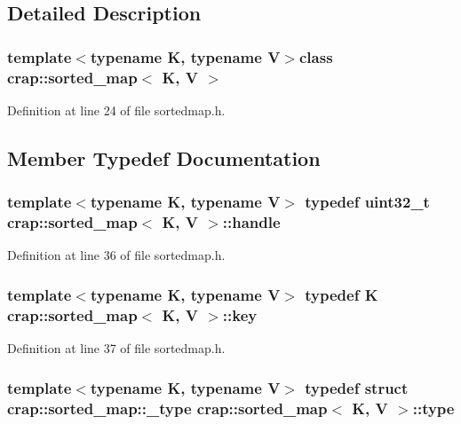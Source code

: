 \subsection{Detailed Description}
\subsubsection*{template$<$typename K, typename V$>$class crap\+::sorted\+\_\+map$<$ K, V $>$}



Definition at line 24 of file sortedmap.\+h.



\subsection{Member Typedef Documentation}
\hypertarget{classcrap_1_1sorted__map_a741a562ba6e22dc1a20e103e75619189}{
\subsubsection[{handle}]{\setlength{\rightskip}{0pt plus 5cm}template$<$typename K, typename V$>$ typedef uint32\+\_\+t {\bf crap\+::sorted\+\_\+map}$<$ K, V $>$\+::{\bf handle}}}\label{classcrap_1_1sorted__map_a741a562ba6e22dc1a20e103e75619189}


Definition at line 36 of file sortedmap.\+h.

\hypertarget{classcrap_1_1sorted__map_a7b1a41d7af597537a793fb19e307716d}{
\subsubsection[{key}]{\setlength{\rightskip}{0pt plus 5cm}template$<$typename K, typename V$>$ typedef K {\bf crap\+::sorted\+\_\+map}$<$ K, V $>$\+::{\bf key}}}\label{classcrap_1_1sorted__map_a7b1a41d7af597537a793fb19e307716d}


Definition at line 37 of file sortedmap.\+h.

\hypertarget{classcrap_1_1sorted__map_a53d3509992e52b87de809a99bf246551}{
\subsubsection[{type}]{\setlength{\rightskip}{0pt plus 5cm}template$<$typename K, typename V$>$ typedef struct {\bf crap\+::sorted\+\_\+map\+::\+\_\+type}
     {\bf crap\+::sorted\+\_\+map}$<$ K, V $>$\+::{\bf type}}}\label{classcrap_1_1sorted__map_a53d3509992e52b87de809a99bf246551}


